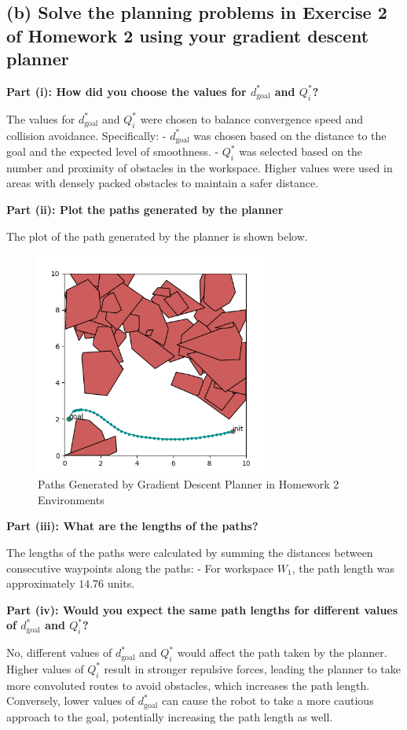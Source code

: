 \documentclass{article}
\begin{document}
\subsection*{(b) Solve the planning problems in Exercise 2 of Homework 2 using your gradient descent planner}

\textbf{Part (i): How did you choose the values for $d^*_{\text{goal}}$ and $Q^*_i$?}

The values for $d^*_{\text{goal}}$ and $Q^*_i$ were chosen to balance convergence speed and collision avoidance. Specifically:
- $d^*_{\text{goal}}$ was chosen based on the distance to the goal and the expected level of smoothness.
- $Q^*_i$ was selected based on the number and proximity of obstacles in the workspace. Higher values were used in areas with densely packed obstacles to maintain a safer distance.

\textbf{Part (ii): Plot the paths generated by the planner}

The plot of the path generated by the planner is shown below.

\begin{figure}[h!]
    \centering
    \includegraphics[width=0.7\textwidth]{partBplot.png}
    \caption{Paths Generated by Gradient Descent Planner in Homework 2 Environments}
    \label{fig:pathGeneratedB}
\end{figure}

\textbf{Part (iii): What are the lengths of the paths?}

The lengths of the paths were calculated by summing the distances between consecutive waypoints along the paths:
- For workspace $W_1$, the path length was approximately $14.76$ units.

\textbf{Part (iv): Would you expect the same path lengths for different values of $d^*_{\text{goal}}$ and $Q^*_i$?}

No, different values of $d^*_{\text{goal}}$ and $Q^*_i$ would affect the path taken by the planner. Higher values of $Q^*_i$ result in stronger repulsive forces, leading the planner to take more convoluted routes to avoid obstacles, which increases the path length. Conversely, lower values of $d^*_{\text{goal}}$ can cause the robot to take a more cautious approach to the goal, potentially increasing the path length as well.
\end{document}
